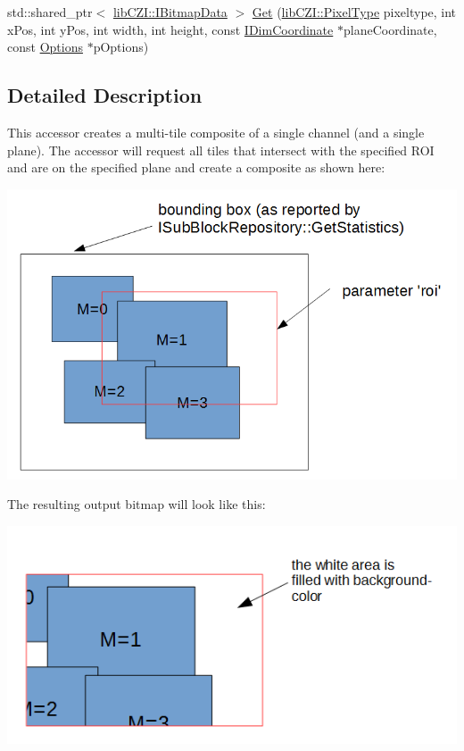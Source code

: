 \begin{DoxyCompactItemize}
\item 
std\+::shared\+\_\+ptr$<$ \hyperlink{classlib_c_z_i_1_1_i_bitmap_data}{lib\+C\+Z\+I\+::\+I\+Bitmap\+Data} $>$ \hyperlink{classlib_c_z_i_1_1_i_single_channel_tile_accessor_a8a9654ed1df4929068477a43597bf084}{Get} (\hyperlink{namespacelib_c_z_i_abf8ce12ab88b06c8b3b47efbb5e2e834}{lib\+C\+Z\+I\+::\+Pixel\+Type} pixeltype, int x\+Pos, int y\+Pos, int width, int height, const \hyperlink{classlib_c_z_i_1_1_i_dim_coordinate}{I\+Dim\+Coordinate} $\ast$plane\+Coordinate, const \hyperlink{structlib_c_z_i_1_1_i_single_channel_tile_accessor_1_1_options}{Options} $\ast$p\+Options)
\end{DoxyCompactItemize}


\subsection{Detailed Description}
This accessor creates a multi-\/tile composite of a single channel (and a single plane). The accessor will request all tiles that intersect with the specified R\+OI and are on the specified plane and create a composite as shown here\+:  
\begin{DoxyImageNoCaption}
  \mbox{\includegraphics[width=\textwidth,height=\textheight/2,keepaspectratio=true]{SingleChannelTileAccessor_1.PNG}}
\end{DoxyImageNoCaption}
 The resulting output bitmap will look like this\+:  
\begin{DoxyImageNoCaption}
  \mbox{\includegraphics[width=\textwidth,height=\textheight/2,keepaspectratio=true]{SingleChannelTileAccessor_2.PNG}}
\end{DoxyImageNoCaption}
